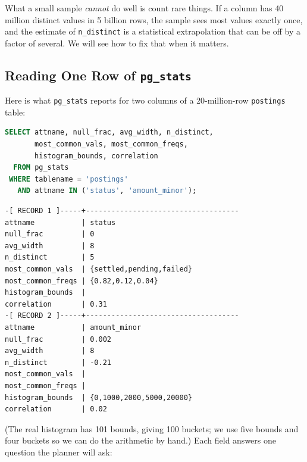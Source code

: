 What a small sample \emph{cannot} do well is count rare things. If a column has 40 million distinct values in 5 billion rows, the sample sees most values exactly once, and the estimate of \texttt{n\_distinct} is a statistical extrapolation that can be off by a factor of several. We will see how to fix that when it matters.

\subsection{Reading One Row of \texttt{pg\_stats}}

Here is what \texttt{pg\_stats} reports for two columns of a 20-million-row \texttt{postings} table:

\begin{lstlisting}[language=SQL]
SELECT attname, null_frac, avg_width, n_distinct,
       most_common_vals, most_common_freqs,
       histogram_bounds, correlation
  FROM pg_stats
 WHERE tablename = 'postings'
   AND attname IN ('status', 'amount_minor');
\end{lstlisting}

\begin{lstlisting}[language=Plain]
-[ RECORD 1 ]-----+------------------------------------
attname           | status
null_frac         | 0
avg_width         | 8
n_distinct        | 5
most_common_vals  | {settled,pending,failed}
most_common_freqs | {0.82,0.12,0.04}
histogram_bounds  |
correlation       | 0.31
-[ RECORD 2 ]-----+------------------------------------
attname           | amount_minor
null_frac         | 0.002
avg_width         | 8
n_distinct        | -0.21
most_common_vals  |
most_common_freqs |
histogram_bounds  | {0,1000,2000,5000,20000}
correlation       | 0.02
\end{lstlisting}

(The real histogram has 101 bounds, giving 100 buckets; we use five bounds and four buckets so we can do the arithmetic by hand.) Each field answers one question the planner will ask:

